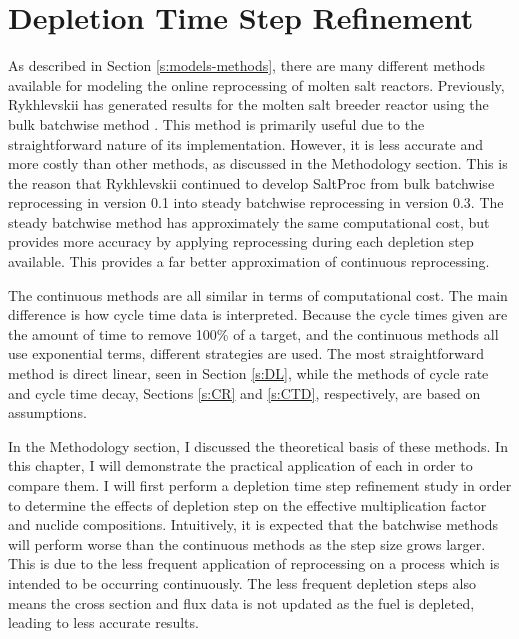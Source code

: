 \renewcommand*\descriptionlabel[1]{\hspace\leftmargin$#1$}
\setcounter{tocdepth}{5}
\setcounter{secnumdepth}{5}



\section{Depletion Time Step Refinement}
\label{s:dep-mesh}

As described in Section \ref{s:models-methods}, there are many different methods available for modeling the online reprocessing of molten salt reactors.
Previously, Rykhlevskii has generated results for the molten salt breeder reactor using the bulk batchwise method \cite{rykhlevskii_advanced_2018}.
This method is primarily useful due to the straightforward nature of its implementation.
However, it is less accurate and more costly than other methods, as discussed in the Methodology section.
This is the reason that Rykhlevskii continued to develop SaltProc from bulk batchwise reprocessing in version 0.1 into steady batchwise reprocessing in version 0.3.
The steady batchwise method has approximately the same computational cost, but provides more accuracy by applying reprocessing during each depletion step available.
This provides a far better approximation of continuous reprocessing.

The continuous methods are all similar in terms of computational cost.
The main difference is how cycle time data is interpreted.
Because the cycle times given are the amount of time to remove 100\% of a target, and the continuous methods all use exponential terms, different strategies are used.
The most straightforward method is direct linear, seen in Section \ref{s:DL}, while the methods of cycle rate and cycle time decay, Sections \ref{s:CR} and \ref{s:CTD}, respectively, are based on assumptions.

In the Methodology section, I discussed the theoretical basis of these methods.
In this chapter, I will demonstrate the practical application of each in order to compare them.
I will first perform a depletion time step refinement study in order to determine the effects of depletion step on the effective multiplication factor and nuclide compositions.
Intuitively, it is expected that the batchwise methods will perform worse than the continuous methods as the step size grows larger.
This is due to the less frequent application of reprocessing on a process which is intended to be occurring continuously.
The less frequent depletion steps also means the cross section and flux data is not updated as the fuel is depleted, leading to less accurate results.

